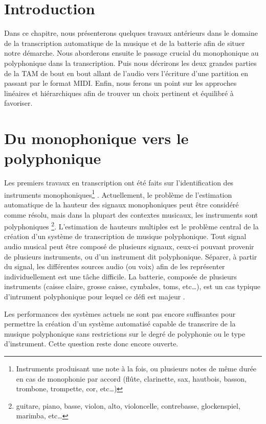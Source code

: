 \section*{Introduction}
Dans ce chapitre, nous présenterons quelques travaux antérieurs dans le domaine
de la transcription automatique de la musique et de la batterie afin de situer
notre démarche. Nous aborderons ensuite le passage crucial du monophonique au
polyphonique dans la transcription. Puis nous décrirons les deux grandes
parties de la TAM de bout en bout allant de l’audio vers l’écriture d’une
partition en passant par le format MIDI. Enfin, nous ferons un point sur les
approches linéaires et hiérarchiques afin de trouver un choix pertinent et
équilibré à favoriser.

\section{Du monophonique vers le polyphonique}
Les premiers travaux en transcription ont été faits sur l’identification des
instruments monophoniques\footnote{Instruments produisant une note à la fois,
ou plusieurs notes de même durée en cas de monophonie par accord (flûte,
clarinette, sax, hautbois, basson, trombone, trompette, cor, etc…)}
\cite{future_directions}. Actuellement, le problème de l’estimation automatique
de la hauteur des signaux monophoniques peut être considéré comme résolu, mais
dans la plupart des contextes musicaux, les instruments sont polyphoniques
\footnote{guitare, piano, basse, violon, alto, violoncelle, contrebasse,
glockenspiel, marimba, etc…}. L’estimation de hauteurs multiples est le
problème central de la création d’un système de transcription de musique
polyphonique. Tout signal audio musical peut être composé de plusieurs signaux,
ceux-ci pouvant provenir de plusieurs instruments, ou d’un instrument dit
polyphonique. Séparer, à partir du signal, les différentes sources audio (ou
voix) afin de les représenter individuellement est une tâche difficile. La
batterie, composée de plusieurs instruments (caisse claire, grosse caisse,
cymbales, toms, etc…), est un cas typique d’intrument polyphonique pour lequel
ce défi est majeur .

Les performances des systèmes actuels ne sont pas encore suffisantes pour
permettre la création d’un système automatisé capable de transcrire de la
musique polyphonique sans restrictions sur le degré de polyphonie ou le type
d’instrument. Cette question reste donc encore ouverte.

